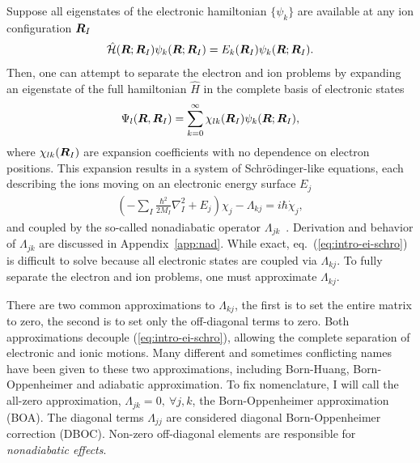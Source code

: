 Suppose all eigenstates of the electronic hamiltonian $\{\psi_k\}$ are available at any ion configuration $\boldsymbol{R}_I$
\begin{align}
\hat{\mathcal{H}} (\boldsymbol{R};\boldsymbol{R}_I) \psi_k(\boldsymbol{R};\boldsymbol{R}_I) = E_k(\boldsymbol{R}_I) \psi_k(\boldsymbol{R};\boldsymbol{R}_I).
\end{align}
Then, one can attempt to separate the electron and ion problems by expanding an eigenstate of the full hamiltonian $\hat{H}$ in the complete basis of electronic states
\begin{align}
\Psi_l(\boldsymbol{R},\boldsymbol{R}_I) = \sum_{k=0}^\infty \chi_{lk}(\boldsymbol{R}_I)\psi_k(\boldsymbol{R};\boldsymbol{R}_I),
\end{align}
where $\chi_{lk}(\boldsymbol{R}_I)$ are expansion coefficients with no dependence on electron positions. This expansion results in a system of Schr\"odinger-like equations, each describing the ions moving on an electronic energy surface $E_j$
\begin{align} \label{eq:intro-ei-schro}
\left(-\sum_I\frac{\hbar^2}{2M_I}\nabla^2_I+E_j\right)\chi_j - \Lambda_{kj} = i\hbar\dot{\chi}_j,
\end{align}
and coupled by the so-called nonadiabatic operator $\Lambda_{jk}$~\cite{Worth2004}.
Derivation and behavior of $\Lambda_{jk}$ are discussed in Appendix~\ref{app:nad}.
While exact, eq.~(\ref{eq:intro-ei-schro}) is difficult to solve because all electronic states are coupled via $\Lambda_{kj}$.
To fully separate the electron and ion problems, one must approximate $\Lambda_{kj}$.

There are two common approximations to $\Lambda_{kj}$, the first is to set the entire matrix to zero, the second is to set only the off-diagonal terms to zero. Both approximations decouple (\ref{eq:intro-ei-schro}), allowing the complete separation of electronic and ionic motions.
Many different and sometimes conflicting names have been given to these two approximations, including Born-Huang, Born-Oppenheimer and adiabatic approximation.
To fix nomenclature, I will call the all-zero approximation, $\Lambda_{jk}=0,~\forall j, k$, the Born-Oppenheimer approximation (BOA).
The diagonal terms $\Lambda_{jj}$ are considered diagonal Born-Oppenheimer correction (DBOC).
Non-zero off-diagonal elements are responsible for \textit{nonadiabatic effects}.

